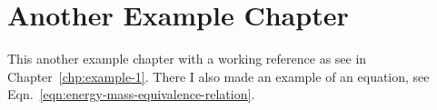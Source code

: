 \documentclass[\main/master.tex]{subfiles}
\begin{document}
\chapter{Another Example Chapter}\label{chp:example-2}
\hspace{5 mm} This another example chapter with a working reference as see in Chapter~\ref{chp:example-1}. There I also made an example of an equation, see Eqn.~\ref{eqn:energy-mass-equivalence-relation}. 
\end{document}

